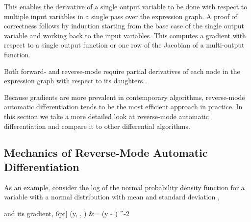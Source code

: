 \documentclass[12pt]{article}
\begin{document}
This enables the derivative of a single output variable to be done
with respect to multiple input variables in a single pass over the
expression graph.  A proof of correctness follows by induction
starting from the base case of the single output variable and working
back to the input variables. This computes a gradient with respect to
a single output function or one row of the Jacobian of a multi-output
function.

Both forward- and reverse-mode require partial derivatives of each
node  in the expression graph with respect to its daughters .

Because gradients are more prevalent in contemporary algorithms,
reverse-mode automatic differentiation tends to be the most efficient
approach in practice.  In this section we take a more detailed look
at reverse-mode automatic differentiation and compare it to other
differential algorithms.

\subsection{Mechanics of Reverse-Mode Automatic Differentiation}

As an example, consider the log of the normal probability density function
for a variable  with a normal distribution with mean  and
standard deviation ,
\renewcommand{\theequation}{\arabic{equation}}

and its gradient,
6pt]
 (y, \mu, \sigma)
&= (y - \mu) \sigma^{-2} \label{gradient-normal-log-density.equation}
\
\end{document}
